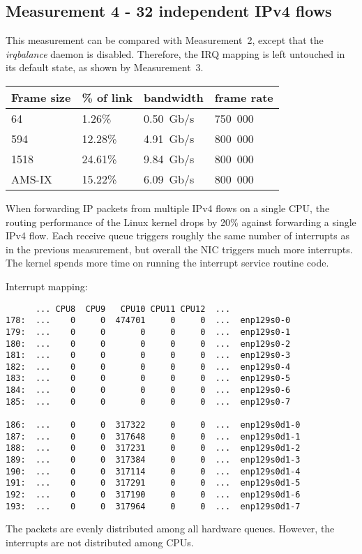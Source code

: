 
\subsection{Measurement 4 - 32 independent IPv4 flows}
This measurement can be compared with Measurement~2, except that the {\it{irqbalance}} daemon is disabled.
Therefore, the IRQ mapping is left untouched in its default state, as shown by Measurement~3.
\begin{tabular}{ | l | l | l | l | }
\hline
Frame size & \% of link & bandwidth & frame rate \\
\hline
64     &  1.26\% &  0.50~Gb/s & 750~000 \\
594    & 12.28\% &  4.91~Gb/s & 800~000 \\
1518   & 24.61\% &  9.84~Gb/s & 800~000 \\
AMS-IX & 15.22\% &  6.09~Gb/s & 800~000 \\
\hline
\end{tabular}
When forwarding IP packets from multiple IPv4 flows on a single CPU,
the routing performance of the Linux kernel drops by 20\% against forwarding a single IPv4 flow.
Each receive queue triggers roughly the same number of interrupts as in the previous measurement,
but overall the NIC triggers much more interrupts.
The kernel spends more time on running the interrupt service routine code.

Interrupt mapping:
\begin{lstlisting}
      ... CPU8  CPU9   CPU10 CPU11 CPU12  ...
178:  ...    0     0  474701     0     0  ...  enp129s0-0
179:  ...    0     0       0     0     0  ...  enp129s0-1
180:  ...    0     0       0     0     0  ...  enp129s0-2
181:  ...    0     0       0     0     0  ...  enp129s0-3
182:  ...    0     0       0     0     0  ...  enp129s0-4
183:  ...    0     0       0     0     0  ...  enp129s0-5
184:  ...    0     0       0     0     0  ...  enp129s0-6
185:  ...    0     0       0     0     0  ...  enp129s0-7

186:  ...    0     0  317322     0     0  ...  enp129s0d1-0
187:  ...    0     0  317648     0     0  ...  enp129s0d1-1
188:  ...    0     0  317231     0     0  ...  enp129s0d1-2
189:  ...    0     0  317384     0     0  ...  enp129s0d1-3
190:  ...    0     0  317114     0     0  ...  enp129s0d1-4
191:  ...    0     0  317291     0     0  ...  enp129s0d1-5
192:  ...    0     0  317190     0     0  ...  enp129s0d1-6
193:  ...    0     0  317964     0     0  ...  enp129s0d1-7
\end{lstlisting}
The packets are evenly distributed among all hardware queues.
However, the interrupts are not distributed among CPUs.

